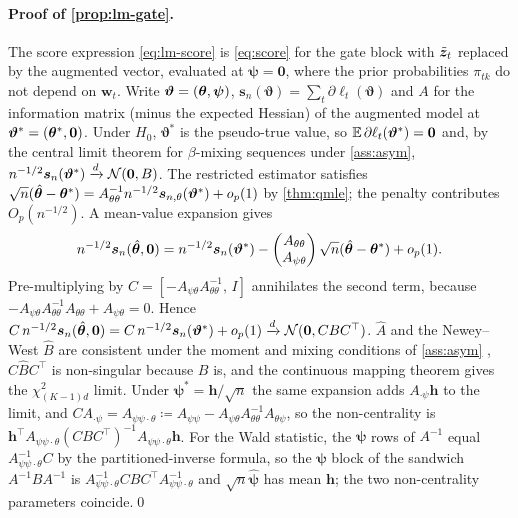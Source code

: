 \paragraph{Proof of \cref{prop:lm-gate}.}
The score expression \eqref{eq:lm-score} is \eqref{eq:score} for the gate block with $\tilde{\bm{z}}_t$
replaced by the augmented vector, evaluated at $\bm\psi=\bm0$, where the prior probabilities
$\pi_{tk}$ do not depend on $\bm w_t$. Write $\bm\vartheta=(\bm{\theta},\bm\psi)$,
$\bm s_n(\bm\vartheta)=\sum_t\partial\ell_t(\bm\vartheta)$ and $A$ for the information matrix (minus the
expected Hessian) of the augmented model at $\bm\vartheta^\ast=(\bm{\theta}^\ast,\bm0)$. Under $H_0$,
$\bm\vartheta^\ast$ is the pseudo-true value, so $\mathbb{E}\,\partial\ell_t(\bm\vartheta^\ast)=\bm0$ and, by the
central limit theorem for $\beta$-mixing sequences under \cref{ass:asym},
$n^{-1/2}\bm s_n(\bm\vartheta^\ast)\xrightarrow{d}\mathcal{N}(\bm0,B)$. The restricted estimator satisfies
$\sqrt n(\hat{\bm{\theta}}-\bm{\theta}^\ast)=A_{\theta\theta}^{-1}n^{-1/2}\bm s_{n,\theta}(\bm\vartheta^\ast)+o_p(1)$
by \cref{thm:qmle}; the penalty contributes $O_p(n^{-1/2})$. A mean-value expansion gives
\[
  n^{-1/2}\bm s_n(\hat{\bm{\theta}},\bm0)=n^{-1/2}\bm s_n(\bm\vartheta^\ast)-
  \begin{pmatrix}A_{\theta\theta}\\A_{\psi\theta}\end{pmatrix}\sqrt n(\hat{\bm{\theta}}-\bm{\theta}^\ast)+o_p(1).
\]
Pre-multiplying by $C=[-A_{\psi\theta}A_{\theta\theta}^{-1},\,I]$ annihilates the second term, because
$-A_{\psi\theta}A^{-1}_{\theta\theta}A_{\theta\theta}+A_{\psi\theta}=0$. Hence
$C\,n^{-1/2}\bm s_n(\hat{\bm{\theta}},\bm0)=C\,n^{-1/2}\bm s_n(\bm\vartheta^\ast)+o_p(1)\xrightarrow{d}\mathcal{N}(\bm0,CBC^\top)$.
$\hat A$ and the Newey--West $\hat B$ are consistent under the moment and mixing conditions of
\cref{ass:asym} \citep{newey1987simple}, $C\hat BC^\top$ is non-singular because $B$ is, and the
continuous mapping theorem gives the $\chi^2_{(K-1)d}$ limit. Under $\bm\psi^\ast=\bm h/\sqrt n$ the
same expansion adds $A_{\cdot\psi}\bm h$ to the limit, and $CA_{\cdot\psi}=A_{\psi\psi\cdot\theta}\coloneqq
A_{\psi\psi}-A_{\psi\theta}A_{\theta\theta}^{-1}A_{\theta\psi}$, so the non-centrality is
$\bm h^\top A_{\psi\psi\cdot\theta}(CBC^\top)^{-1}A_{\psi\psi\cdot\theta}\bm h$. For the Wald statistic,
the $\bm\psi$ rows of $A^{-1}$ equal $A_{\psi\psi\cdot\theta}^{-1}C$ by the partitioned-inverse formula,
so the $\bm\psi$ block of the sandwich $A^{-1}BA^{-1}$ is
$A_{\psi\psi\cdot\theta}^{-1}CBC^\top A_{\psi\psi\cdot\theta}^{-1}$ and $\sqrt n\hat{\bm\psi}$ has
mean $\bm h$; the two non-centrality parameters coincide.\qed

